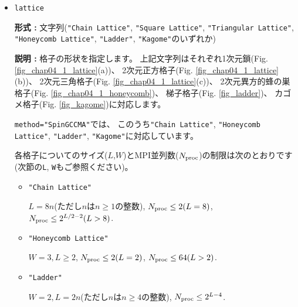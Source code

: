 \begin{itemize}
  {\bf 形式 :} 文字列(\verb|"Lanczos"|, \verb|"TPQ"|, \verb|"Full Diag"|,
  \verb|"CG"|, \verb|"Time-Evolution"|のいずれか)

{\bf 説明 :} 実行する計算の種類を指定します。
上記の文字列はそれぞれランチョス法による少数固有状態の計算, 
熱力学的純粋状態を用いた有限温度計算, 
直接法による全固有状態計算,
LOBCG法\cite{doi:10.1137/S1064827500366124,transactionJSCES2006}による少数固有状態の計算,
実時間発展計算
に対応します。

後述のスペクトル計算において使用される手法もこのパラメーターで指定されます
\verb|"CG"|とした場合には
付属している$K\omega$ライブラリ\cite{komega}が呼び出され、
シードスイッチ付きシフト双共役勾配法
\cite{Frommer2003,doi:10.1143/JPSJ.77.114713}が適用されます。

\item \verb|lattice|

{\bf 形式 :} 文字列(\verb|"Chain Lattice"|, \verb|"Square Lattice"|, 
\verb|"Triangular Lattice"|, \verb|"Honeycomb Lattice"|, \verb|"Ladder"|, \verb|"Kagome"|のいずれか)

{\bf 説明 :} 格子の形状を指定します。
上記文字列はそれぞれ1次元鎖(Fig. \ref{fig_chap04_1_lattice}(a))、
2次元正方格子(Fig. \ref{fig_chap04_1_lattice}(b))、
2次元三角格子(Fig. \ref{fig_chap04_1_lattice}(c))、
2次元異方的蜂の巣格子(Fig. \ref{fig_chap04_1_honeycomb})、
梯子格子(Fig. \ref{fig_ladder})、
カゴメ格子(Fig. \ref{fig_kagome})に対応します。

\verb|method="SpinGCCMA"|では、
このうち\verb|"Chain Lattice"|, \verb|"Honeycomb Lattice"|, 
\verb|"Ladder"|, \verb|"Kagome"|に対応しています。

各格子についてのサイズ($L$,$W$)とMPI並列数($N_{\rm proc}$)の制限は次のとおりです
(次節の\verb|L|, \verb|W|もご参照ください)。

\begin{itemize}

  \item \verb|"Chain Lattice"|

    $L = 8n$(ただし$n$は$n\geq1$の整数),
    $N_{\rm proc} \leq 2(L=8)$, $N_{\rm proc} \leq 2^{L/2-2}(L>8)$.
    
  \item \verb|"Honeycomb Lattice"|

    $W=3, L \geq 2$, $N_{\rm proc} \leq 2(L=2)$, $N_{\rm proc} \leq 64(L>2)$.

  \item \verb|"Ladder"|

    $W=2, L = 2n$(ただし$n$は$n\geq4$の整数),
    $N_{\rm proc} \leq 2^{L-4}$.


\end{itemize}
\end{itemize}
